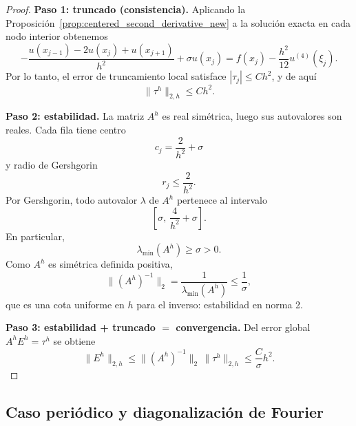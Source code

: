 \documentclass[a4paper,11pt]{report}
\begin{document}
\begin{proof}
\textbf{Paso 1: truncado (consistencia).}
Aplicando la Proposición~\ref{prop:centered_second_derivative_new} a la solución exacta en cada nodo interior obtenemos
\[
  -\frac{u(x_{j-1})-2u(x_j)+u(x_{j+1})}{h^2}+\sigma u(x_j)=f(x_j)-\frac{h^2}{12}u^{(4)}(\xi_j).
\]
Por lo tanto, el error de truncamiento local satisface $|\tau_j|\le Ch^2$, y de aquí
\[
  \|\tau^h\|_{2,h}\le Ch^2.
\]

\textbf{Paso 2: estabilidad.}
La matriz $A^h$ es real simétrica, luego sus autovalores son reales. Cada fila tiene centro
\[
  c_j=\frac{2}{h^2}+\sigma
\]
y radio de Gershgorin
\[
  r_j\le \frac{2}{h^2}.
\]
Por Gershgorin, todo autovalor $\lambda$ de $A^h$ pertenece al intervalo
\[
  \left[\sigma,\,\frac{4}{h^2}+\sigma\right].
\]
En particular,
\[
  \lambda_{\min}(A^h)\ge \sigma>0.
\]
Como $A^h$ es simétrica definida positiva,
\[
  \|(A^h)^{-1}\|_2=\frac{1}{\lambda_{\min}(A^h)}\le \frac{1}{\sigma},
\]
que es una cota uniforme en $h$ para el inverso: estabilidad en norma 2.

\textbf{Paso 3: estabilidad + truncado $=$ convergencia.}
Del error global $A^hE^h=\tau^h$ se obtiene
\[
  \|E^h\|_{2,h}\le \|(A^h)^{-1}\|_2\,\|\tau^h\|_{2,h}
  \le \frac{C}{\sigma}h^2.
\]
\end{proof}

\subsection{Caso periódico y diagonalización de Fourier}
\end{document}
